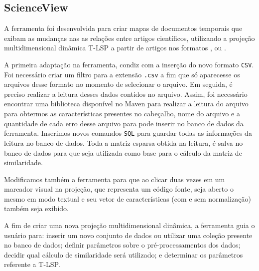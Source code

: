 		\subsection{ScienceView}
		\label{sec:scienceView}
		
		A ferramenta  \cite{Alencar} foi desenvolvida para criar
		mapas de documentos temporais que exibam as mudanças nas as relações entre
		artigos científicos, utilizando a projeção multidimensional dinâmica \acs{T-LSP}
		a partir de artigos nos formatos , 
		ou .
		
		A primeira adaptação na ferramenta, condiz com a inserção do novo formato \texttt{CSV}.
		Foi necessário criar um filtro para a extensão \texttt{.csv} a fim que só aparecesse
		os arquivos desse formato no momento de selecionar o arquivo. Em seguida, é preciso
		realizar a leitura desses dados contidos no arquivo. Assim, foi necessário encontrar
		uma biblioteca disponível no Maven para realizar a leitura do arquivo para obtermos
		as características presentes no cabeçalho, nome do arquivo e a quantidade de cada
		erro desse arquivo para pode inserir no banco de dados da ferramenta. Inserimos novos
		comandos \texttt{SQL} para guardar todas as informações da leitura no banco de dados.
		Toda a matriz esparsa obtida na leitura, é salva no banco de dados para que seja
		utilizada como base para o cálculo da matriz de similaridade.
		
		Modificamos também a ferramenta para que ao clicar duas vezes em um marcador visual
		na projeção, que representa um código fonte, seja aberto o mesmo em modo textual e
		seu vetor de características (com e sem normalização) também seja exibido.
		
		A fim de criar uma nova projeção multidimensional dinâmica, a ferramenta guia o
		usuário para: inserir um novo conjunto de dados ou utilizar uma coleção presente
		no banco de dados; definir parâmetros sobre o pré-processamentos dos dados; decidir
		qual cálculo de similaridade será utilizado; e determinar os parâmetros referente
		a \acs{T-LSP}.

		
